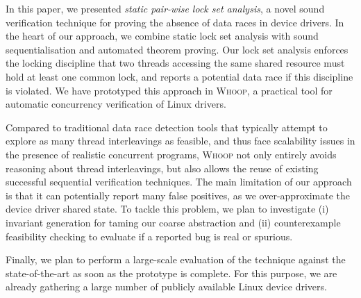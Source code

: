 In this paper, we presented \emph{static pair-wise lock set analysis}, a novel sound verification technique for proving the absence of data races in device drivers. In the heart of our approach, we combine static lock set analysis with sound sequentialisation and automated theorem proving. Our lock set analysis enforces the locking discipline that two threads accessing the same shared resource must hold at least one common lock, and reports a potential data race if this discipline is violated. We have prototyped this approach in \textsc{Whoop}, a practical tool for automatic concurrency verification of Linux drivers.

Compared to traditional data race detection tools that typically attempt to explore as many thread interleavings as feasible, and thus face scalability issues in the presence of realistic concurrent programs, \textsc{Whoop} not only entirely avoids reasoning about thread interleavings, but also allows the reuse of existing successful sequential verification techniques. The main limitation of our approach is that it can potentially report many false positives, as we over-approximate the device driver shared state. To tackle this problem, we plan to investigate (i) invariant generation for taming our coarse abstraction and (ii) counterexample feasibility checking to evaluate if a reported bug is real or spurious.

Finally, we plan to perform a large-scale evaluation of the technique against the state-of-the-art as soon as the prototype is complete. For this purpose, we are already gathering a large number of publicly available Linux device drivers.